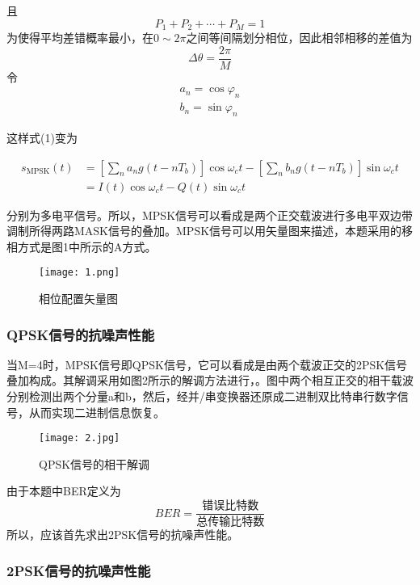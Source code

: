 \documentclass[bwprint]{gmcmthesis}
\numberwithin{equation}{section}
\begin{document}
且
\begin{equation}
P_{1}+P_{2}+\cdots+P_{M}=1
\end{equation}
为使得平均差错概率最小，在$0\sim2\pi$之间等间隔划分相位，因此相邻相移的差值为
$$
\Delta \theta=\frac{2 \pi}{M}
$$
令
\begin{equation}
\begin{aligned}
a_{n}=\cos \varphi_{n} \\ b_{n}=\sin \varphi_{n}
\end{aligned}
\end{equation}

这样式(1)变为

\begin{equation}
\begin{aligned}
s_{\mathrm{MPSK}}(t)&=\left[\sum_{n} a_{n} g\left(t-n T_{b}\right)\right] \cos \omega_{c} t-\left[\sum_{n} b_{n} g\left(t-n T_{b}\right)\right] \sin \omega_{c} t\\
&=I(t) \cos \omega_{c} t-Q(t) \sin \omega_{c} t
\end{aligned}
\end{equation}

分别为多电平信号。所以，MPSK信号可以看成是两个正交载波进行多电平双边带调制所得两路MASK信号的叠加。MPSK信号可以用矢量图来描述，本题采用的移相方式是图1中所示的A方式。

\begin{figure}[htbp]
	\centering
	\texttt{[image: 1.png]}
	\caption{相位配置矢量图}
\end{figure}

\subsubsection*{QPSK信号的抗噪声性能}
当M=4时，MPSK信号即QPSK信号，它可以看成是由两个载波正交的2PSK信号叠加构成。其解调采用如图2所示的解调方法进行，。图中两个相互正交的相干载波分别检测出两个分量a和b，然后，经并/串变换器还原成二进制双比特串行数字信号，从而实现二进制信息恢复。
\begin{figure}[htbp]
	\centering
	\texttt{[image: 2.jpg]}
	\caption{QPSK信号的相干解调}
\end{figure}
由于本题中BER定义为
\begin{equation}
	BER = \frac{\mbox{错误比特数}}{\mbox{总传输比特数}}
\end{equation}
所以，应该首先求出2PSK信号的抗噪声性能。
\subsubsection*{2PSK信号的抗噪声性能}
\end{document}
